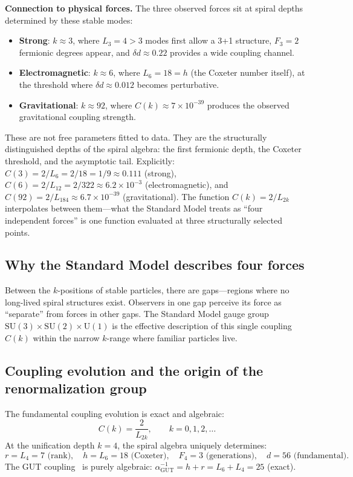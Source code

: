\documentclass[12pt,a4paper]{article}
\begin{document}
\textbf{Connection to physical forces.} The three observed forces sit at spiral depths determined by these stable modes:
\begin{itemize}
\item \textbf{Strong}: $k \approx 3$, where $L_3 = 4 > 3$ modes first allow a 3+1 structure, $F_3 = 2$ fermionic degrees appear, and $\delta d \approx 0.22$ provides a wide coupling channel.
\item \textbf{Electromagnetic}: $k \approx 6$, where $L_6 = 18 = h$ (the Coxeter number itself), at the threshold where $\delta d \approx 0.012$ becomes perturbative.
\item \textbf{Gravitational}: $k \approx 92$, where $C(k) \approx 7 \times 10^{-39}$ produces the observed gravitational coupling strength.
\end{itemize}
These are not free parameters fitted to data. They are the structurally distinguished depths of the spiral algebra: the first fermionic depth, the Coxeter threshold, and the asymptotic tail. Explicitly: $C(3) = 2/L_6 = 2/18 = 1/9 \approx 0.111$ (strong), $C(6) = 2/L_{12} = 2/322 \approx 6.2 \times 10^{-3}$ (electromagnetic), and $C(92) = 2/L_{184} \approx 6.7 \times 10^{-39}$ (gravitational). The function $C(k) = 2/L_{2k}$ interpolates between them---what the Standard Model treats as ``four independent forces'' is one function evaluated at three structurally selected points.

\subsection{Why the Standard Model describes four forces}

Between the $k$-positions of stable particles, there are gaps---regions where no long-lived spiral structures exist. Observers in one gap perceive its force as ``separate'' from forces in other gaps. The Standard Model gauge group $\mathrm{SU}(3) \times \mathrm{SU}(2) \times \mathrm{U}(1)$ is the effective description of this single coupling $C(k)$ within the narrow $k$-range where familiar particles live.

\subsection{Coupling evolution and the origin of the renormalization group}
\label{sec:rg-running}

The fundamental coupling evolution is exact and algebraic:
\begin{equation}
C(k) = \frac{2}{L_{2k}}, \qquad k = 0, 1, 2, \ldots
\end{equation}
At the unification depth $k = 4$, the spiral algebra uniquely determines:
\begin{equation}
r = L_4 = 7 \text{ (rank)}, \quad h = L_6 = 18 \text{ (Coxeter)}, \quad F_4 = 3 \text{ (generations)}, \quad d = 56 \text{ (fundamental)}.
\end{equation}
The GUT coupling~\cite{GeorgiGlashow1974} is purely algebraic: $\alpha_{\mathrm{GUT}}^{-1} = h + r = L_6 + L_4 = 25$ (exact).
\end{document}
